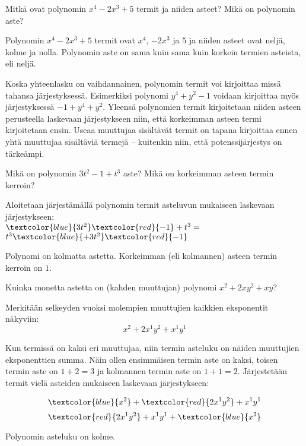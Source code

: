 \begin{esimerkki}
    Mitkä ovat polynomin $x^4-2x^3+5$ termit ja niiden asteet? Mikä on polynomin aste?
    \begin{esimvast}
        Polynomin $x^4-2x^3+5$ termit ovat $x^4$, $-2x^3$ ja $5$ ja niiden asteet ovat
        neljä, kolme ja nolla. Polynomin aste on sama kuin sama kuin
        korkein termien asteista, eli neljä.
    \end{esimvast}
\end{esimerkki}


Koska yhteenlasku on vaihdannainen, polynomin termit voi kirjoittaa missä tahansa järjestyksessä. Esimerkiksi polynomi $y^4+y^2-1$ voidaan kirjoittaa myös järjestyksessä $-1+y^4+y^2$. Yleensä polynomien termit kirjoitetaan niiden asteen perusteella laskevaan järjestykseen niin, että korkeimman asteen termi kirjoitetaan ensin. Useaa muuttujaa sisältävät termit on tapana kirjoittaa ennen yhtä muuttujaa sisältäviä termejä – kuitenkin niin, että potenssijärjestys on tärkeämpi.

\begin{esimerkki}
	Mikä on polynomin $3t^2-1+t^3$ aste? Mikä on korkeimman asteen termin kerroin?
\begin{esimratk}
	
Aloitetaan järjestämällä polynomin termit asteluvun mukaiseen laskevaan järjestykseen: \\
	  $\textcolor{blue}{3t^2}\textcolor{red}{-1}+t^3=$ \\
	  $t^3\textcolor{blue}{+3t^2}\textcolor{red}{-1}$ \\
	
\end{esimratk}

\begin{esimvast}
Polynomi on kolmatta astetta. Korkeimman (eli kolmannen) asteen termin kerroin on $1$.
\end{esimvast}

\end{esimerkki}

\begin{esimerkki}
	Kuinka monetta astetta on (kahden muuttujan) polynomi $x^2+2xy^2+xy$?
\begin{esimratk}
Merkitään selkeyden vuoksi molempien muuttujien kaikkien eksponentit näkyviin: \\
\[x^2+2x^1y^2+x^1y^1\]

Kun termissä on kaksi eri muuttujaa, niin termin asteluku on näiden muuttujien eksponenttien summa. Näin ollen ensimmäisen termin aste on kaksi, toisen termin aste on $1+2=3$ ja kolmannen termin aste on $1+1=2$. Järjestetään termit vielä asteiden mukaiseen laskevaan järjestykseen:

\[\textcolor{blue}{x^2}+\textcolor{red}{2x^1y^2}+x^1y^1\]
\[\textcolor{red}{2x^1y^2}+x^1y^1+\textcolor{blue}{x^2}\]

\end{esimratk} 

\begin{esimvast}
Polynomin asteluku on kolme.
\end{esimvast}

\end{esimerkki}

